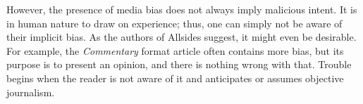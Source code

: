 However, the presence of media bias does not always imply malicious intent. It is in human nature to draw on experience; thus, one can simply not be aware of their implicit bias. As the authors of Allsides suggest, it might even be desirable. For example, the \textit{Commentary} format article often contains more bias, but its purpose is to present an opinion, and there is nothing wrong with that. Trouble begins when the reader is not aware of it and anticipates or assumes objective journalism.





